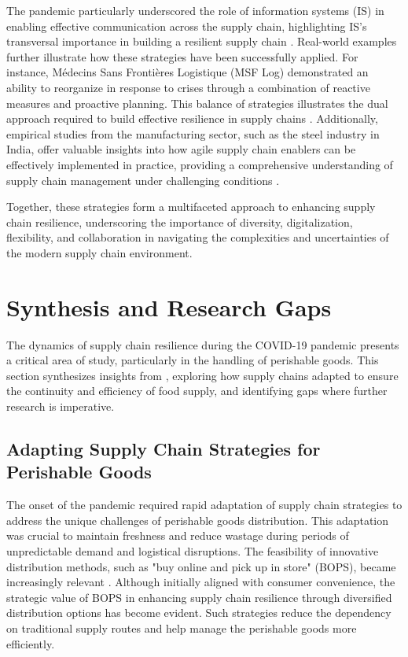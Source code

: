The pandemic particularly underscored the role of information systems (IS) in enabling effective communication across the supply chain, highlighting IS's transversal importance in building a resilient supply chain \parencite{Michel2023DimensionsPandemic}. Real-world examples further illustrate how these strategies have been successfully applied. For instance, Médecins Sans Frontières Logistique (MSF Log) demonstrated an ability to reorganize in response to crises through a combination of reactive measures and proactive planning. This balance of strategies illustrates the dual approach required to build effective resilience in supply chains \parencite{Michel2023DimensionsPandemic}. Additionally, empirical studies from the manufacturing sector, such as the steel industry in India, offer valuable insights into how agile supply chain enablers can be effectively implemented in practice, providing a comprehensive understanding of supply chain management under challenging conditions \parencite{Mishra2024RedefiningFactors}.

Together, these strategies form a multifaceted approach to enhancing supply chain resilience, underscoring the importance of diversity, digitalization, flexibility, and collaboration in navigating the complexities and uncertainties of the modern supply chain environment.

\section{Synthesis and Research Gaps}

The dynamics of supply chain resilience during the COVID-19 pandemic presents a critical area of study, particularly in the handling of perishable goods. This section synthesizes insights from \textcite{Li2010TheValue, RiveroGutierrez2020OmnichannelSector, Zhang2020IntegrationBOPS}, exploring how supply chains adapted to ensure the continuity and efficiency of food supply, and identifying gaps where further research is imperative.

\subsection{Adapting Supply Chain Strategies for Perishable Goods}

The onset of the pandemic required rapid adaptation of supply chain strategies to address the unique challenges of perishable goods distribution. This adaptation was crucial to maintain freshness and reduce wastage during periods of unpredictable demand and logistical disruptions. The feasibility of innovative distribution methods, such as "buy online and pick up in store" (BOPS), became increasingly relevant \parencite{Zhang2020IntegrationBOPS}. Although initially aligned with consumer convenience, the strategic value of BOPS in enhancing supply chain resilience through diversified distribution options has become evident. Such strategies reduce the dependency on traditional supply routes and help manage the perishable goods more efficiently.

